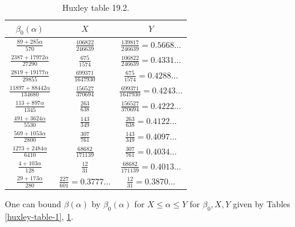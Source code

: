     \begin{table}[ht]
        \caption{Huxley table 19.2.}
        \label{huxley-table-2}
        \centering
        \renewcommand{\arraystretch}{1.2}
        \begin{tabular}{|c|c|c|}
        \hline
        $\beta_0(\alpha)$  & $X$ & $Y$ \\
        \hline
        $\frac{89+285\alpha}{570}$ & $\frac{106822}{246639}$ & $\frac{139817}{246639}=0.5668\dots$ \\
        \hline
        $\frac{2387+17972\alpha}{27290}$ & $\frac{675}{1574}$ & $\frac{106822}{246639}=0.4331\dots$ \\
        \hline
        $\frac{2819+19177\alpha}{29855}$ & $\frac{699371}{1647930}$ & $\frac{675}{1574}=0.4288\dots$ \\
        \hline
        $\frac{11897+88442\alpha}{134680}$ & $\frac{156527}{370694}$ & $\frac{699371}{1647930}=0.4243\dots$ \\
        \hline
        $\frac{113+897\alpha}{1345}$ & $\frac{263}{638}$ & $\frac{156527}{370694} = 0.4222\dots$ \\
        \hline
        $\frac{491+3624\alpha}{5530}$ & $\frac{143}{349}$ & $\frac{263}{638} = 0.4122\dots$ \\
        \hline
        $\frac{569+1053\alpha}{2800}$ & $\frac{307}{761}$ & $\frac{143}{349} = 0.4097\dots$ \\
        \hline
        $\frac{1273+2484\alpha}{6410}$ & $\frac{68682}{171139}$ & $\frac{307}{761} = 0.4034\dots$ \\
        \hline
        $\frac{4+103\alpha}{128}$ & $\frac{12}{31}$ & $\frac{68682}{171139}=0.4013\dots$ \\
        \hline
        $\frac{29+173\alpha}{280}$ & $\frac{227}{601}=0.3777\dots$ & $\frac{12}{31} = 0.3870\dots$ \\
        \hline
        \end{tabular}
\end{table}


\begin{theorem}\label{huxley-table}  One can bound $\beta(\alpha)$ by $\beta_0(\alpha)$ for $X \leq \alpha \leq Y$ for $\beta_0, X, Y$ given by Tables \ref{huxley-table-1}, \ref{huxley-table-2}.
\end{theorem}


\literature
{}\\

